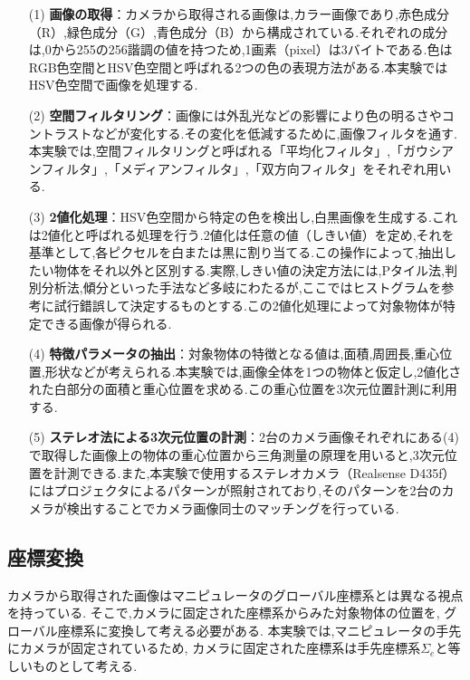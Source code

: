 \begin{enumerate}
  \item[(1)] \textbf{画像の取得}：カメラから取得される画像は,カラー画像であり,赤色成分（R）,緑色成分（G）,青色成分（B）から構成されている.それぞれの成分は,0から255の256諧調の値を持つため,1画素（pixel）は3バイトである.色はRGB色空間とHSV色空間と呼ばれる2つの色の表現方法がある.本実験ではHSV色空間で画像を処理する.
    
  \item[(2)] \textbf{空間フィルタリング}：画像には外乱光などの影響により色の明るさやコントラストなどが変化する.その変化を低減するために,画像フィルタを通す.本実験では,空間フィルタリングと呼ばれる「平均化フィルタ」,「ガウシアンフィルタ」,「メディアンフィルタ」,「双方向フィルタ」をそれぞれ用いる.
    
  \item[(3)] \textbf{2値化処理}：HSV色空間から特定の色を検出し,白黒画像を生成する.これは2値化と呼ばれる処理を行う.2値化は任意の値（しきい値）を定め,それを基準として,各ピクセルを白または黒に割り当てる.この操作によって,抽出したい物体をそれ以外と区別する.実際,しきい値の決定方法には,Pタイル法,判別分析法,傾分といった手法など多岐にわたるが,ここではヒストグラムを参考に試行錯誤して決定するものとする.この2値化処理によって対象物体が特定できる画像が得られる.
    
  \item[(4)] \textbf{特徴パラメータの抽出}：対象物体の特徴となる値は,面積,周囲長,重心位置,形状などが考えられる.本実験では,画像全体を1つの物体と仮定し,2値化された白部分の面積と重心位置を求める.この重心位置を3次元位置計測に利用する.
    
  \item[(5)] \textbf{ステレオ法による3次元位置の計測}：2台のカメラ画像それぞれにある(4)で取得した画像上の物体の重心位置から三角測量の原理を用いると,3次元位置を計測できる.また,本実験で使用するステレオカメラ（Realsense D435f）にはプロジェクタによるパターンが照射されており,そのパターンを2台のカメラが検出することでカメラ画像同士のマッチングを行っている.
\end{enumerate}

\subsection{座標変換}
カメラから取得された画像はマニピュレータのグローバル座標系とは異なる視点を持っている.
そこで,カメラに固定された座標系からみた対象物体の位置を,
グローバル座標系に変換して考える必要がある.
本実験では,マニピュレータの手先にカメラが固定されているため,
カメラに固定された座標系は手先座標系$\Sigma_e$と等しいものとして考える.

